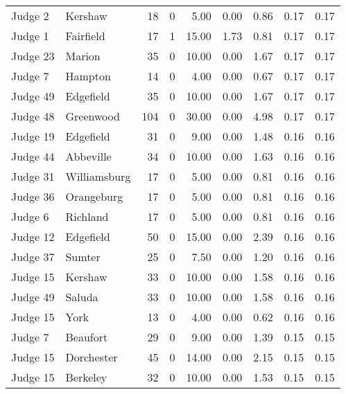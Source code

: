 \begin{tabular}{llrrrrrrr}
 Judge 2 &      Kershaw &    18 &      0 &  5.00 &       0.00 &      0.86 &         0.17 &      0.17 \\
 Judge 1 &    Fairfield &    17 &      1 & 15.00 &       1.73 &      0.81 &         0.17 &      0.17 \\
Judge 23 &       Marion &    35 &      0 & 10.00 &       0.00 &      1.67 &         0.17 &      0.17 \\
 Judge 7 &      Hampton &    14 &      0 &  4.00 &       0.00 &      0.67 &         0.17 &      0.17 \\
Judge 49 &    Edgefield &    35 &      0 & 10.00 &       0.00 &      1.67 &         0.17 &      0.17 \\
Judge 48 &    Greenwood &   104 &      0 & 30.00 &       0.00 &      4.98 &         0.17 &      0.17 \\
Judge 19 &    Edgefield &    31 &      0 &  9.00 &       0.00 &      1.48 &         0.16 &      0.16 \\
Judge 44 &    Abbeville &    34 &      0 & 10.00 &       0.00 &      1.63 &         0.16 &      0.16 \\
Judge 31 & Williamsburg &    17 &      0 &  5.00 &       0.00 &      0.81 &         0.16 &      0.16 \\
Judge 36 &   Orangeburg &    17 &      0 &  5.00 &       0.00 &      0.81 &         0.16 &      0.16 \\
 Judge 6 &     Richland &    17 &      0 &  5.00 &       0.00 &      0.81 &         0.16 &      0.16 \\
Judge 12 &    Edgefield &    50 &      0 & 15.00 &       0.00 &      2.39 &         0.16 &      0.16 \\
Judge 37 &       Sumter &    25 &      0 &  7.50 &       0.00 &      1.20 &         0.16 &      0.16 \\
Judge 15 &      Kershaw &    33 &      0 & 10.00 &       0.00 &      1.58 &         0.16 &      0.16 \\
Judge 49 &       Saluda &    33 &      0 & 10.00 &       0.00 &      1.58 &         0.16 &      0.16 \\
Judge 15 &         York &    13 &      0 &  4.00 &       0.00 &      0.62 &         0.16 &      0.16 \\
 Judge 7 &     Beaufort &    29 &      0 &  9.00 &       0.00 &      1.39 &         0.15 &      0.15 \\
Judge 15 &   Dorchester &    45 &      0 & 14.00 &       0.00 &      2.15 &         0.15 &      0.15 \\
Judge 15 &     Berkeley &    32 &      0 & 10.00 &       0.00 &      1.53 &         0.15 &      0.15 \\

\end{tabular}
